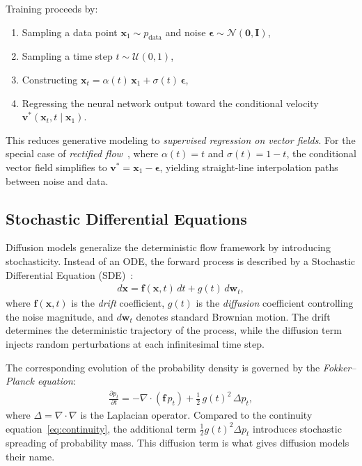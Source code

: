 Training proceeds by:
\begin{enumerate}
    \item Sampling a data point $\mathbf{x}_1 \sim p_{\text{data}}$ and noise $\boldsymbol{\epsilon} \sim \mathcal{N}(\mathbf{0}, \mathbf{I})$,
    \item Sampling a time step $t \sim \mathcal{U}(0, 1)$,
    \item Constructing $\mathbf{x}_t = \alpha(t)\,\mathbf{x}_1 + \sigma(t)\,\boldsymbol{\epsilon}$,
    \item Regressing the neural network output toward the conditional velocity $\mathbf{v}^*(\mathbf{x}_t, t \mid \mathbf{x}_1)$.
\end{enumerate}
This reduces generative modeling to \emph{supervised regression on vector fields}. For the special case of \emph{rectified flow}~\cite{liu2023flow}, where $\alpha(t) = t$ and $\sigma(t) = 1 - t$, the conditional vector field simplifies to $\mathbf{v}^* = \mathbf{x}_1 - \boldsymbol{\epsilon}$, yielding straight-line interpolation paths between noise and data.

\subsection{Stochastic Differential Equations}
\label{subsec:sde}

Diffusion models generalize the deterministic flow framework by introducing stochasticity. Instead of an ODE, the forward process is described by a Stochastic Differential Equation (SDE)~\cite{song2021scorebased}:
\begin{align}
    d\mathbf{x} = \mathbf{f}(\mathbf{x}, t)\, dt + g(t)\, d\mathbf{w}_t,
    \label{eq:forward_sde}
\end{align}
where $\mathbf{f}(\mathbf{x}, t)$ is the \emph{drift} coefficient, $g(t)$ is the \emph{diffusion} coefficient controlling the noise magnitude, and $d\mathbf{w}_t$ denotes standard Brownian motion. The drift determines the deterministic trajectory of the process, while the diffusion term injects random perturbations at each infinitesimal time step.

The corresponding evolution of the probability density is governed by the \emph{Fokker--Planck equation}:
\begin{align}
    \frac{\partial p_t}{\partial t} = -\nabla \cdot (\mathbf{f}\, p_t) + \frac{1}{2}\,g(t)^2\,\Delta p_t,
    \label{eq:fokker_planck}
\end{align}
where $\Delta = \nabla \cdot \nabla$ is the Laplacian operator. Compared to the continuity equation~\eqref{eq:continuity}, the additional term $\frac{1}{2}g(t)^2 \Delta p_t$ introduces stochastic spreading of probability mass. This diffusion term is what gives diffusion models their name.

